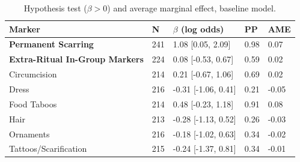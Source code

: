 \begin{table}[!ht]
\centering
\small
\caption{Hypothesis test ($\beta > 0$) and average marginal effect, baseline model.}
\label{tab:int_hypothesis_ame_baseline}
\begin{tabular}{lllll}
\toprule
Marker & N & $\beta$ (log odds) & PP & AME \\
\midrule
\textbf{Permanent Scarring} & 241 & 1.08 [0.05, 2.09] & 0.98 & 0.07 \\
\textbf{Extra-Ritual In-Group Markers} & 224 & 0.08 [-0.53, 0.67] & 0.59 & 0.02 \\
\midrule
Circumcision & 214 & 0.21 [-0.67, 1.06] & 0.69 & 0.02 \\
Dress & 216 & -0.31 [-1.06, 0.41] & 0.21 & -0.05 \\
Food Taboos & 214 & 0.48 [-0.23, 1.18] & 0.91 & 0.08 \\
Hair & 213 & -0.28 [-1.13, 0.52] & 0.26 & -0.03 \\
Ornaments & 216 & -0.18 [-1.02, 0.63] & 0.34 & -0.02 \\
Tattoos/Scarification & 215 & -0.24 [-1.37, 0.81] & 0.34 & -0.01 \\
\bottomrule
\end{tabular}
\end{table}